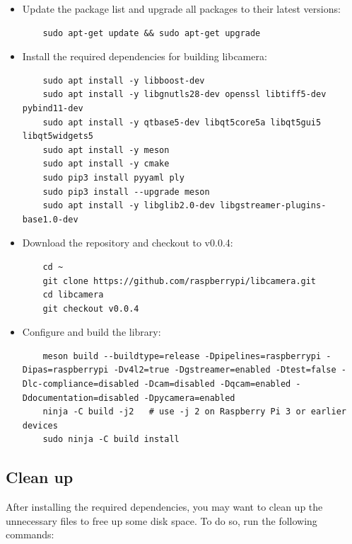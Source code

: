 \begin{itemize}
      \item Update the package list and upgrade all packages to their latest versions:

            \begin{lstlisting}
    sudo apt-get update && sudo apt-get upgrade
    \end{lstlisting}

      \item Install the required dependencies for building libcamera:

            \begin{lstlisting}
    sudo apt install -y libboost-dev
    sudo apt install -y libgnutls28-dev openssl libtiff5-dev pybind11-dev
    sudo apt install -y qtbase5-dev libqt5core5a libqt5gui5 libqt5widgets5
    sudo apt install -y meson
    sudo apt install -y cmake
    sudo pip3 install pyyaml ply
    sudo pip3 install --upgrade meson
    sudo apt install -y libglib2.0-dev libgstreamer-plugins-base1.0-dev
    \end{lstlisting}

      \item Download the repository and checkout to v0.0.4:

            \begin{lstlisting}
    cd ~
    git clone https://github.com/raspberrypi/libcamera.git
    cd libcamera
    git checkout v0.0.4
    \end{lstlisting}

      \item Configure and build the library:

            \begin{lstlisting}
    meson build --buildtype=release -Dpipelines=raspberrypi -Dipas=raspberrypi -Dv4l2=true -Dgstreamer=enabled -Dtest=false -Dlc-compliance=disabled -Dcam=disabled -Dqcam=enabled -Ddocumentation=disabled -Dpycamera=enabled
    ninja -C build -j2   # use -j 2 on Raspberry Pi 3 or earlier devices
    sudo ninja -C build install
    \end{lstlisting}

\end{itemize}

\subsection{Clean up}

After installing the required dependencies, you may want to clean up the unnecessary files to free up some disk space. To do so, run the following commands:

